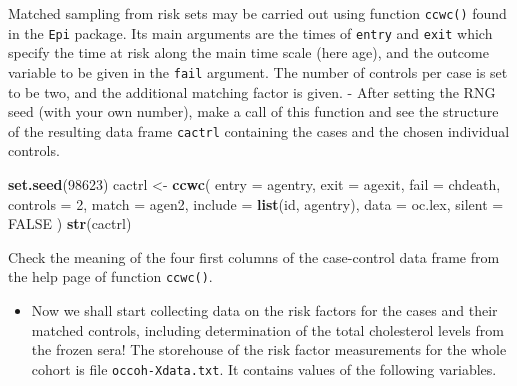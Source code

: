 \documentclass[
]{book}
\newenvironment{Shaded}{\begin{snugshade}}{\end{snugshade}}
\newcommand{\AttributeTok}[1]{\textcolor[rgb]{0.13,0.29,0.53}{#1}}
\newcommand{\ConstantTok}[1]{\textcolor[rgb]{0.56,0.35,0.01}{#1}}
\newcommand{\DecValTok}[1]{\textcolor[rgb]{0.00,0.00,0.81}{#1}}
\newcommand{\FunctionTok}[1]{\textcolor[rgb]{0.13,0.29,0.53}{\textbf{#1}}}
\newcommand{\NormalTok}[1]{#1}
\newcommand{\OtherTok}[1]{\textcolor[rgb]{0.56,0.35,0.01}{#1}}
\providecommand{\tightlist}{%
  \setlength{\itemsep}{0pt}\setlength{\parskip}{0pt}}
\begin{document}
Matched sampling from risk sets may be carried out using
function \texttt{ccwc()} found in the \texttt{Epi} package.
Its main arguments are the times
of \texttt{entry} and \texttt{exit} which specify the time at risk along the
main time scale (here age), and the outcome variable to be given
in the \texttt{fail} argument. The number of controls per case
is set to be two, and the additional matching factor is given.
- After setting the RNG seed (with your own number),
make a call of this function and see
the structure of the resulting data frame \texttt{cactrl}
containing the cases and the chosen individual controls.

\begin{Shaded}
\begin{Highlighting}[]
\FunctionTok{set.seed}\NormalTok{(}\DecValTok{98623}\NormalTok{)}
\NormalTok{cactrl }\OtherTok{\textless{}{-}}
  \FunctionTok{ccwc}\NormalTok{(}
    \AttributeTok{entry =}\NormalTok{ agentry, }\AttributeTok{exit =}\NormalTok{ agexit, }\AttributeTok{fail =}\NormalTok{ chdeath,}
    \AttributeTok{controls =} \DecValTok{2}\NormalTok{, }\AttributeTok{match =}\NormalTok{ agen2,}
    \AttributeTok{include =} \FunctionTok{list}\NormalTok{(id, agentry),}
    \AttributeTok{data =}\NormalTok{ oc.lex, }\AttributeTok{silent =} \ConstantTok{FALSE}
\NormalTok{  )}
\FunctionTok{str}\NormalTok{(cactrl)}
\end{Highlighting}
\end{Shaded}

Check the meaning of the four first columns of the case-control
data frame from the help page of function \texttt{ccwc()}.

\begin{itemize}
\tightlist
\item
  Now we shall start collecting data on the
  risk factors for the cases and their
  matched controls, including determination of the total cholesterol levels from the frozen sera! The storehouse of the risk factor measurements for
  the whole cohort is file \texttt{occoh-Xdata.txt}. It contains
  values of the following variables.
\end{itemize}
\end{document}
